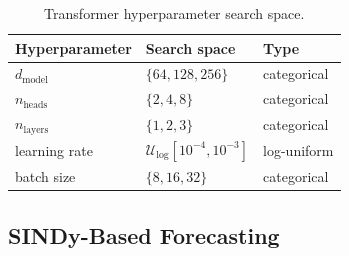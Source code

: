 \documentclass[12pt, a4paper]{article}
\begin{document}
\begin{table}[h]
\centering
\caption{Transformer hyperparameter search space.}
\label{tab:tf_sweep}
\begin{tabular}{lll}
\toprule
Hyperparameter & Search space & Type \\
\midrule
\(d_{\text{model}}\) & \(\{64, 128, 256\}\)              & categorical \\
\(n_{\text{heads}}\) & \(\{2, 4, 8\}\)                   & categorical \\
\(n_{\text{layers}}\) & \(\{1, 2, 3\}\)                  & categorical \\
learning rate & \(\mathcal{U}_{\log}[10^{-4}, 10^{-3}]\) & log-uniform \\
batch size    & \(\{8, 16, 32\}\)                        & categorical \\
\bottomrule
\end{tabular}
\end{table}

\subsection{SINDy-Based Forecasting}\label{sec:sindy}
\end{document}
